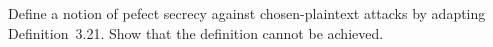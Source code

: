 \documentclass[a4paper,10pt,landscape,twocolumn]{scrartcl}
\begin{document}
\begin{bonusexercise}
Define a notion of pefect secrecy against chosen-plaintext attacks by adapting Definition~3.21. Show that the definition cannot be achieved.
\end{bonusexercise}



%
\end{document}
